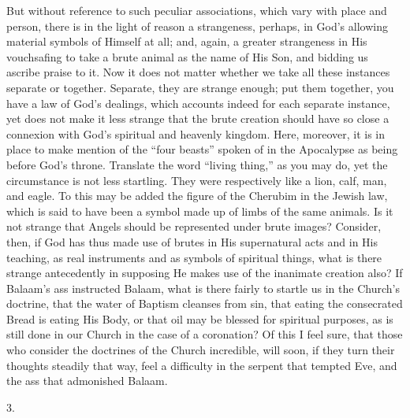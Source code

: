 But without reference to such peculiar associations, which vary
with place and person, there is in the light of reason a strangeness,
perhaps, in God's allowing material symbols of Himself at all; and,
again, a greater strangeness in His vouchsafing to take a brute animal
as the name of His Son, and bidding us ascribe praise to it. Now it
does not matter whether we take all these instances separate or
together. Separate, they are strange enough; put them together, you
have a law of God's dealings, which accounts indeed for each separate
instance, yet does not make it less strange that the brute creation
should have so close a connexion with God's spiritual and heavenly
kingdom. Here, moreover, it is in place to make mention of the
``four beasts'' spoken of in the Apocalypse as being before
God's throne. Translate the word ``living thing,'' as you may
do, yet the circumstance is not less startling. They were respectively
like a lion, calf, man, and eagle. To this may be added the figure of
the Cherubim in the Jewish law, which is said to have been a
symbol made up of limbs of the same animals. Is it not strange that
Angels should be represented under brute images? Consider, then, if
God has thus made use of brutes in His supernatural acts and in His
teaching, as real instruments and as symbols of spiritual things, what
is there strange antecedently in supposing He makes use of the
inanimate creation also? If Balaam's ass instructed Balaam, what is
there fairly to startle us in the Church's doctrine, that the water of
Baptism cleanses from sin, that eating the consecrated Bread is eating
His Body, or that oil may be blessed for spiritual purposes, as is
still done in our Church in the case of a coronation? Of this I feel
sure, that those who consider the doctrines of the Church incredible,
will soon, if they turn their thoughts steadily that way, feel a
difficulty in the serpent that tempted Eve, and the ass that
admonished Balaam.

3.

